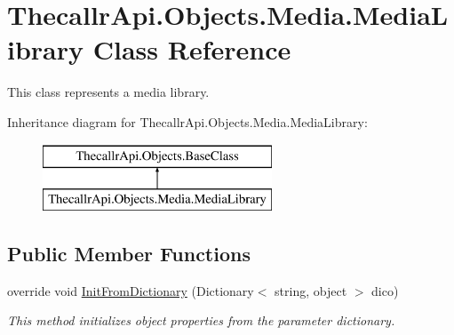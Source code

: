 \hypertarget{class_thecallr_api_1_1_objects_1_1_media_1_1_media_library}{\section{Thecallr\+Api.\+Objects.\+Media.\+Media\+Library Class Reference}
\label{class_thecallr_api_1_1_objects_1_1_media_1_1_media_library}
}


This class represents a media library.  


Inheritance diagram for Thecallr\+Api.\+Objects.\+Media.\+Media\+Library\+:\begin{figure}[H]
\begin{center}
\leavevmode
\includegraphics[height=2.000000cm]{class_thecallr_api_1_1_objects_1_1_media_1_1_media_library}
\end{center}
\end{figure}
\subsection*{Public Member Functions}
\begin{DoxyCompactItemize}
\item 
override void \hyperlink{class_thecallr_api_1_1_objects_1_1_media_1_1_media_library_a533f9580df9163ab2a17fd40ba75186a}{Init\+From\+Dictionary} (Dictionary$<$ string, object $>$ dico)
\begin{DoxyCompactList}\small\item\em This method initializes object properties from the parameter dictionary. \end{DoxyCompactList}\end{DoxyCompactItemize}
